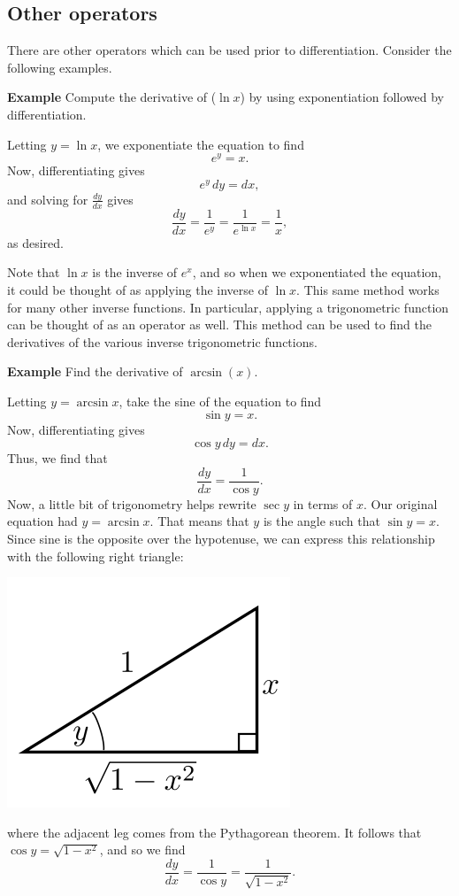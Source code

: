 \documentclass[twoside,openright,titlepage,a4paper]{book}
\begin{document}
\begin{sloppypar}
\subsection{Other operators}

There are other operators which can be used prior to differentiation. Consider the following examples.

\textbf{Example} Compute the derivative of ($\ln x$) by using exponentiation followed by differentiation. 
\begin{examplebox}
Letting $y = \ln x$, we exponentiate the equation to find \[ e^y = x. \]
Now, differentiating gives \[ e^y \, dy = dx, \] and solving for $\frac{dy}{dx}$ gives \[ \frac{dy}{dx} = \frac{1}{e^y} = \frac{1}{e^{\ln x}} = \frac{1}{x}, \] as desired.	
\end{examplebox}

Note that $\ln x$ is the inverse of $e^x$, and so when we exponentiated the equation, it could be thought of as applying the inverse of $\ln x$. This same method works for many other inverse functions. In particular, applying a trigonometric function can be thought of as an operator as well. This method can be used to find the derivatives of the various inverse trigonometric functions.

\textbf{Example} Find the derivative of $\arcsin(x)$.
\begin{examplebox}
Letting $y = \arcsin x$, take the sine of the equation to find \[ \sin y = x. \]
Now, differentiating gives \[ \cos y \, dy = dx. \]
Thus, we find that \[ \frac{dy}{dx} = \frac{1}{\cos y}. \]
Now, a little bit of trigonometry helps rewrite $\sec y$ in terms of $x$. Our original equation had $y = \arcsin x$. That means that $y$ is the angle such that $\sin y = x$. Since sine is the opposite over the hypotenuse, we can express this relationship with the following right triangle:
\begin{center}\includegraphics[scale=0.6]{SinTrig}\end{center}
where the adjacent leg comes from the Pythagorean theorem. It follows that $\cos y = \sqrt{1-x^2}$, and so we find \[ \frac{dy}{dx} = \frac{1}{\cos y} = \frac{1}{\sqrt{1-x^2}}. \]
\end{examplebox}


\end{sloppypar}
\end{document}
